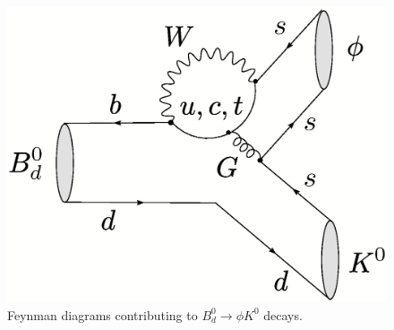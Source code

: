 \documentclass[11pt]{cernrep}
\begin{document}
\begin{figure}
\centerline{
 \includegraphics[width=5.5truecm]{B0dtophiK0.ps} 
 }
 \vspace*{-0.3truecm}
\caption{Feynman diagrams contributing to $B^0_d\to \phi K^0$ 
decays.}\label{fig:BphiK-diag}
\end{figure}


%
%
%
\boldmath
\end{document}
